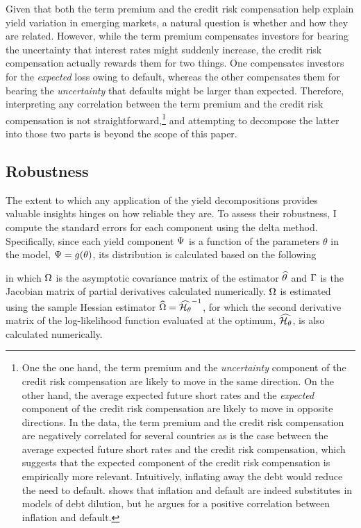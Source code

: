 {Given that both the term premium and the credit risk compensation help explain yield variation in emerging markets, a natural question is whether and how they are related. 
However, while the term premium compensates investors for bearing the uncertainty that interest rates might suddenly increase, the credit risk compensation actually rewards them for two things. 
One compensates investors for the \textit{expected} loss owing to default, whereas the other compensates them for bearing the \textit{uncertainty} that defaults might be larger than expected. 
Therefore, interpreting any correlation between the term premium and the credit risk compensation is not straightforward,\footnote{ One the one hand, the term premium and the \textit{uncertainty} component of the credit risk compensation are likely to move in the same direction. On the other hand, the average expected future short rates and the \textit{expected} component of the credit risk compensation are likely to move in opposite directions. In the data, the term premium and the credit risk compensation are negatively correlated for several countries as is the case between the average expected future short rates and the credit risk compensation, which suggests that the expected component of the credit risk compensation is empirically more relevant. Intuitively, inflating away the debt would reduce the need to default. \cite{Galli:2020} shows that inflation and default are indeed substitutes in models of debt dilution, but he argues for a positive correlation between inflation and default.} 
and attempting to decompose the latter into those two parts is beyond the scope of this paper.


\subsection{Robustness}
The extent to which any application of the yield decompositions provides valuable insights hinges on how reliable they are.
To assess their robustness, I compute the standard errors for each component using the delta method.
Specifically, since each yield component \(\Psi\) is a function of the parameters \(\theta\) in the model, \(\Psi = g(\theta) \), its distribution is calculated based on the following

\noindent in which \(\Omega\) is the asymptotic covariance matrix of the estimator \(\widehat{\theta}\) and \(\Gamma\) is the Jacobian matrix of partial derivatives calculated numerically. 
\(\Omega\) is estimated using the sample Hessian estimator \(\widehat{\Omega} = \widehat{\mathcal{H}_\theta}^{-1} \), for which the second derivative matrix of the log-likelihood function evaluated at the optimum, \(\widehat{\mathcal{H}_\theta}\), is also calculated numerically.%

}
